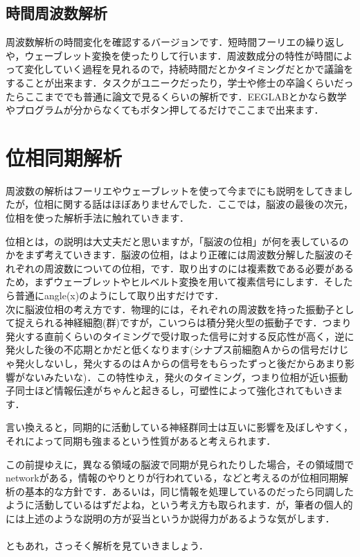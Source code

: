 \documentclass[11pt,a4paper]{ujreport} 	%
\begin{document}
\section{時間周波数解析}
周波数解析の時間変化を確認するバージョンです．短時間フーリエの繰り返しや，ウェーブレット変換を使ったりして行います．周波数成分の特性が時間によって変化していく過程を見れるので，持続時間だとかタイミングだとかで議論をすることが出来ます．タスクがユニークだったり，学士や修士の卒論くらいだったらここまででも普通に論文で見るくらいの解析です．EEGLABとかなら数学やプログラムが分からなくてもボタン押してるだけでここまで出来ます．


\chapter{位相同期解析}
周波数の解析はフーリエやウェーブレットを使って今までにも説明をしてきましたが，位相に関する話はほぼありませんでした．ここでは，脳波の最後の次元，位相を使った解析手法に触れていきます．

位相とは，の説明は大丈夫だと思いますが，「脳波の位相」が何を表しているのかをまず考えていきます．脳波の位相，はより正確には周波数分解した脳波のそれぞれの周波数についての位相，です．取り出すのには複素数である必要があるため，まずウェーブレットやヒルベルト変換を用いて複素信号にします．そしたら普通にangle(x)のようにして取り出すだけです．\\

次に脳波位相の考え方です．物理的には，それぞれの周波数を持った振動子として捉えられる神経細胞(群)ですが，こいつらは積分発火型の振動子です．つまり発火する直前くらいのタイミングで受け取った信号に対する反応性が高く，逆に発火した後の不応期とかだと低くなります(シナプス前細胞Ａからの信号だけじゃ発火しないし，発火するのはＡからの信号をもらったずっと後だからあまり影響がないみたいな)．この特性ゆえ，発火のタイミング，つまり位相が近い振動子同士ほど情報伝達がちゃんと起きるし，可塑性によって強化されてもいきます．

言い換えると，同期的に活動している神経群同士は互いに影響を及ぼしやすく，それによって同期も強まるという性質があると考えられます．

この前提ゆえに，異なる領域の脳波で同期が見られたりした場合，その領域間でnetworkがある，情報のやりとりが行われている，などと考えるのが位相同期解析の基本的な方針です．あるいは，同じ情報を処理しているのだったら同調したように活動しているはずだよね，という考え方も取られます．が，筆者の個人的には上述のような説明の方が妥当というか説得力があるような気がします．\\
\\
ともあれ，さっそく解析を見ていきましょう．
\end{document}
